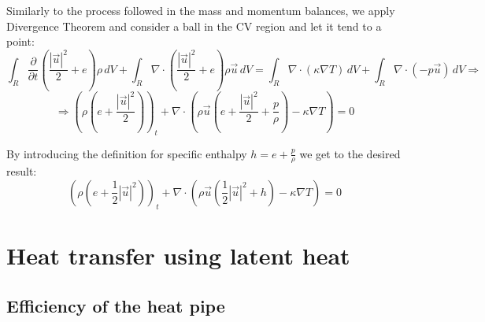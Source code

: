\documentclass{article}
\begin{document}
Similarly to the process followed in the mass and momentum balances, we apply Divergence Theorem and consider a ball in the CV region and let it tend to a point:
$$
\int_{R}\frac{\partial}{\partial t}\left(\frac{|\vec{u}|^2}{2}+e\right)\rho\,dV + \int_{R}\nabla\cdot\left(\frac{|\vec{u}|^2}{2}+e\right)\rho\vec{u}\,dV=\int_{ R}\nabla\cdot\left(\kappa \nabla T\right)\,dV+\int_{R}\nabla\cdot(-p\vec{u})\, dV \Rightarrow 
$$
\begin{equation}
\Rightarrow \left(\rho\left(e+\frac{|\vec{u}|^2}{2}\right)\right)_t + \nabla\cdot\left(\rho\vec{u}\left(e+\frac{|\vec{u}|^2}{2}+\frac{p}{\rho}\right)-\kappa\nabla T\right)=0
\end{equation}

By introducing the definition for specific enthalpy $h=e+\frac{p}{\rho}$ we get to the desired result:
\begin{equation}
    \boxed{
    (\rho(e+\frac{1}{2}|\vec{u}|^2))_t + \nabla\cdot(\rho\vec{u}(\frac{1}{2}|\vec{u}|^2+h)-\kappa\nabla T)=0
    }
\end{equation}

\section{Heat transfer using latent heat}
\subsection{Efficiency of the heat pipe}
\end{document}
